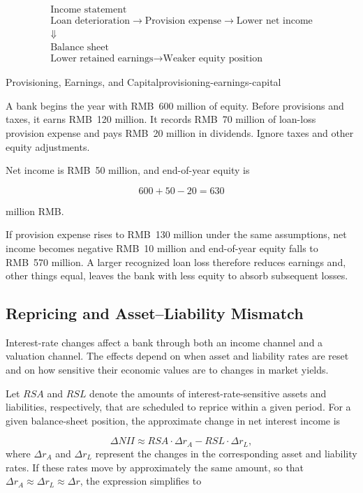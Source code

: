\[
\begin{array}{c}
\text{Income statement} \\[2pt]
\text{Loan deterioration}
\rightarrow
\text{Provision expense}
\rightarrow
\text{Lower net income}
\\[5pt]
\Downarrow
\\[-1pt]
\text{Balance sheet} \\[2pt]
\text{Lower retained earnings}
\rightarrow
\text{Weaker equity position}
\end{array}
\]

\begin{example}{Provisioning, Earnings, and Capital}{provisioning-earnings-capital}

A bank begins the year with RMB~600 million of equity. Before provisions and taxes, it earns RMB~120 million. It records RMB~70 million of loan-loss provision expense and pays RMB~20 million in dividends. Ignore taxes and other equity adjustments.

Net income is RMB~50 million, and end-of-year equity is

\[
600+50-20=630
\]

million RMB.

If provision expense rises to RMB~130 million under the same assumptions, net income becomes negative RMB~10 million and end-of-year equity falls to RMB~570 million. A larger recognized loan loss therefore reduces earnings and, other things equal, leaves the bank with less equity to absorb subsequent losses.

\end{example}

\subsection{Repricing and Asset--Liability Mismatch}

Interest-rate changes affect a bank through both an income channel and a valuation channel. The effects depend on when asset and liability rates are reset and on how sensitive their economic values are to changes in market yields.

Let $\textit{RSA}$ and $\textit{RSL}$ denote the amounts of interest-rate-sensitive
assets and liabilities, respectively, that are scheduled to reprice
within a given period. For a given balance-sheet position, the
approximate change in net interest income is

\begin{equation}
\Delta \textit{NII}\approx \textit{RSA}\cdot\Delta r_A
-RSL\cdot\Delta r_L,
\end{equation}
where $\Delta r_A$ and $\Delta r_L$ represent the changes in the
corresponding asset and liability rates. If these rates move by
approximately the same amount, so that
$\Delta r_A\approx\Delta r_L\approx\Delta r$, the expression
simplifies to

